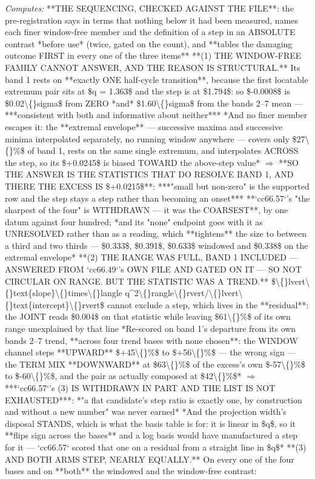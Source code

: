 \begin{description}
\emph{Computes:}  **THE SEQUENCING, CHECKED AGAINST THE FILE**: the pre-registration says in terms that nothing below it had been measured, names each finer window-free member and the definition of a step in an ABSOLUTE contrast *before use* (twice, gated on the count), and **tables the damaging outcome FIRST in every one of the three items**   **(1) THE WINDOW-FREE FAMILY CANNOT ANSWER, AND THE REASON IS STRUCTURAL.** Its band 1 rests on **exactly ONE half-cycle transition**, because the first locatable extremum pair sits at \$q = 1.363\$ and the step is at \$1.794\$: so \$-0.0008\$ is \$0.02\textbackslash\{\}sigma\$ from ZERO *and* \$1.60\textbackslash\{\}sigma\$ from the bands 2--7 mean --- ***consistent with both and informative about neither***  *And no finer member escapes it: the **extremal envelope** --- successive maxima and successive minima interpolated separately, no running window anywhere --- covers only \$27\textbackslash\{\}\%\$ of band 1, rests on the same single extremum, and interpolates ACROSS the step, so its \$+0.0245\$ is biased TOWARD the above-step value*  \ensuremath{\Rightarrow} **SO THE ANSWER IS THE STATISTICS THAT DO RESOLVE BAND 1, AND THERE THE EXCESS IS \$+0.0215\$**: ***"small but non-zero" is the supported row and the step stays a step rather than becoming an onset***   **`cc66.57`'s "the sharpest of the four" is WITHDRAWN --- it was the COARSEST**, by one datum against four hundred; *and its "none" endpoint goes with it as UNRESOLVED rather than as a reading, which **tightens** the size to between a third and two thirds --- \$0.333\$, \$0.391\$, \$0.633\$ windowed and \$0.338\$ on the extremal envelope*   **(2) THE RANGE WAS FULL, BAND 1 INCLUDED --- ANSWERED FROM `cc66.49`'s OWN FILE AND GATED ON IT --- SO NOT CIRCULAR ON RANGE. BUT THE STATISTIC WAS A TREND.** \$\textbackslash\{\}lvert\textbackslash\{\}text\{slope\}\textbackslash\{\}times\textbackslash\{\}langle q\textasciicircum{}2\textbackslash\{\}rangle\textbackslash\{\}rvert/\textbackslash\{\}lvert\textbackslash\{\}text\{intercept\}\textbackslash\{\}rvert\$ cannot exclude a step, which lives in the **residual**: the JOINT reads \$0.004\$ on that statistic while leaving \$61\textbackslash\{\}\%\$ of its own range unexplained by that line  *Re-scored on band 1's departure from its own bands 2--7 trend, **across four trend bases with none chosen**: the WINDOW channel steps **UPWARD** \$+45\textbackslash\{\}\%\$ to \$+56\textbackslash\{\}\%\$ --- the wrong sign --- the TERM MIX **DOWNWARD** at \$63\textbackslash\{\}\%\$ of the excess's own \$-57\textbackslash\{\}\%\$ to \$-60\textbackslash\{\}\%\$, and the pair as actually composed at \$42\textbackslash\{\}\%\$*  \ensuremath{\Rightarrow} ***`cc66.57`'s (3) IS WITHDRAWN IN PART AND THE LIST IS NOT EXHAUSTED***: *"a flat candidate's step ratio is exactly one, by construction and without a new number" was never earned*  *And the projection width's disposal STANDS, which is what the basis table is for: it is linear in \$q\$, so it **flips sign across the bases** and a log basis would have manufactured a step for it --- `cc66.57` scored that one on a residual from a straight line in \$q\$*   **(3) AND BOTH ARMS STEP, NEARLY EQUALLY.** On every one of the four bases and on **both** the windowed and the window-free contrast: 
\end{description}
